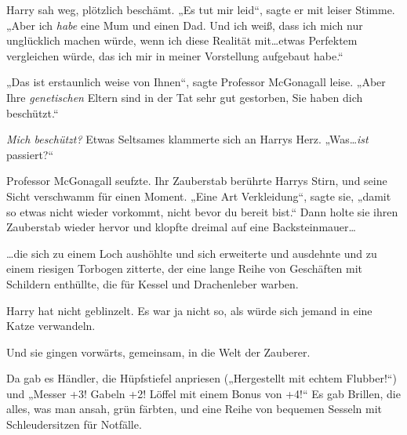 Harry sah weg, plötzlich beschämt. „Es tut mir leid“, sagte er mit leiser Stimme. „Aber ich \emph{habe} eine Mum und einen Dad. Und ich weiß, dass ich mich nur unglücklich machen würde, wenn ich diese Realität mit…etwas Perfektem vergleichen würde, das ich mir in meiner Vorstellung aufgebaut habe.“

„Das ist erstaunlich weise von Ihnen“, sagte Professor McGonagall leise. „Aber Ihre \emph{genetischen} Eltern sind in der Tat sehr gut gestorben, Sie haben dich beschützt.“

\emph{Mich beschützt?} Etwas Seltsames klammerte sich an Harrys Herz. „Was…\emph{ist} passiert?“

Professor McGonagall seufzte. Ihr Zauberstab berührte Harrys Stirn, und seine Sicht verschwamm für einen Moment. „Eine Art Verkleidung“, sagte sie, „damit so etwas nicht wieder vorkommt, nicht bevor du bereit bist.“ Dann holte sie ihren Zauberstab wieder hervor und klopfte dreimal auf eine Backsteinmauer…

…die sich zu einem Loch aushöhlte und sich erweiterte und ausdehnte und zu einem riesigen Torbogen zitterte, der eine lange Reihe von Geschäften mit Schildern enthüllte, die für Kessel und Drachenleber warben.

Harry hat nicht geblinzelt. Es war ja nicht so, als würde sich jemand in eine Katze verwandeln.

Und sie gingen vorwärts, gemeinsam, in die Welt der Zauberer.

Da gab es Händler, die Hüpfstiefel anpriesen („Hergestellt mit echtem Flubber!“) und „Messer +3! Gabeln +2! Löffel mit einem Bonus von +4!“ Es gab Brillen, die alles, was man ansah, grün färbten, und eine Reihe von bequemen Sesseln mit Schleudersitzen für Notfälle.

